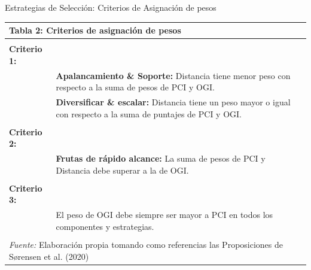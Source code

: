 \documentclass{beamer}
\begin{document}
\begin{frame}{Estrategias de Selección: Criterios de Asignación de pesos}
    \begin{table}[!ht]
    \centering
    \begin{adjustbox}{max width=1.05\textwidth} %

    \begin{tabular}{ll}
    \multicolumn{2}{l}{\textbf{Tabla 2: Criterios de asignación de pesos}} \\
    \hline
    \\
    \textbf{Criterio 1:} & \\
    & \textbf{Apalancamiento \& Soporte:} Distancia tiene menor peso con respecto a la suma de pesos de PCI y OGI. \\
    & \textbf{Diversificar \& escalar:} Distancia tiene un peso mayor o igual con respecto a la suma de puntajes de PCI y OGI. \\
    \\
    \textbf{Criterio 2:} & \\
    & \textbf{Frutas de rápido alcance:} La suma de pesos de PCI y Distancia debe superar a la de OGI. \\
    \\
    \textbf{Criterio 3:} & \\
    & El peso de OGI debe siempre ser mayor a PCI en todos los componentes y estrategias. \\
    \\
    \hline
    \multicolumn{2}{l}{\textit{Fuente:} Elaboración propia tomando como referencias las Proposiciones de Sørensen et al. (2020)} \\
    \end{tabular}
    \end{adjustbox}
    \end{table}
\end{frame}
\end{document}
